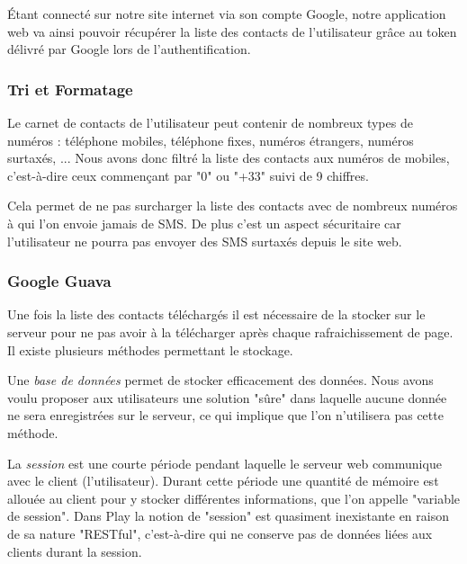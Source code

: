 Étant connecté sur notre site internet via son compte Google, notre application web va ainsi pouvoir récupérer la liste des contacts de l'utilisateur grâce au token délivré par Google lors de l'authentification.


\subsubsection{Tri et Formatage}

Le carnet de contacts de l'utilisateur peut contenir de nombreux types de numéros : téléphone mobiles, téléphone fixes, numéros étrangers, numéros surtaxés, ...
Nous avons donc filtré la liste des contacts aux numéros de mobiles, c'est-à-dire ceux commençant par "0" ou "+33" suivi de 9 chiffres.

Cela permet de ne pas surcharger la liste des contacts avec de nombreux numéros à qui l'on envoie jamais de SMS.
De plus c'est un aspect sécuritaire car l'utilisateur ne pourra pas envoyer des SMS surtaxés depuis le site web.


\subsubsection{Google Guava}

Une fois la liste des contacts téléchargés il est nécessaire de la stocker sur le serveur pour ne pas avoir à la télécharger après chaque rafraichissement de page.
Il existe plusieurs méthodes permettant le stockage.

Une \textit{base de données} permet de stocker efficacement des données.
Nous avons voulu proposer aux utilisateurs une solution "sûre" dans laquelle aucune donnée ne sera enregistrées sur le serveur, ce qui implique que l'on n'utilisera pas cette méthode.

La \textit{session} est une courte période pendant laquelle le serveur web communique avec le client (l'utilisateur).
Durant cette période une quantité de mémoire est allouée au client pour y stocker différentes informations, que l'on appelle "variable de session".
Dans Play la notion de "session" est quasiment inexistante en raison de sa nature "RESTful", c'est-à-dire qui ne conserve pas de données liées aux clients durant la session.

